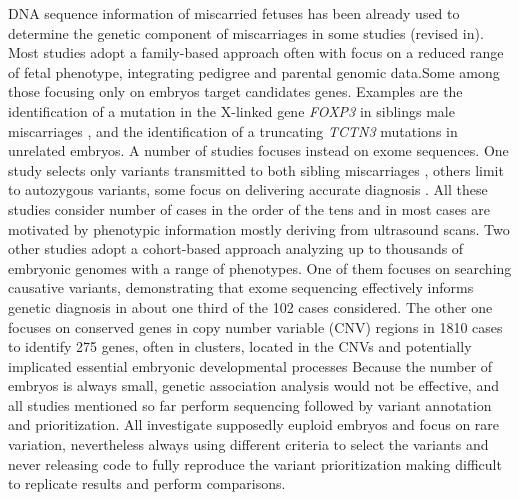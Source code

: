 DNA sequence information of miscarried fetuses has been already used to determine the genetic component of miscarriages in some studies (revised in\cite{rajcan2020next, filges2015exome}). Most studies adopt a family-based approach often with focus on a reduced range of fetal phenotype, integrating pedigree and parental genomic data\cite{bondeson2017nonsense, dohrn2015ecel1,wilbe2015musk, cristofoli2017novel}.Some among those focusing only on embryos target candidates genes. Examples are the identification of a mutation in the X-linked gene \textit{FOXP3} in siblings male miscarriages \cite{rae2015novel}, and the identification of a truncating \textit{TCTN3} mutations in unrelated embryos\cite{thomas2012tctn3}. A number of studies focuses instead on exome sequences\cite{shamseldin2015identification, qiao2016whole,fu2018whole, meier2019exome, yates2017whole}. One study selects only variants transmitted to both sibling miscarriages \cite{qiao2016whole}, others limit to autozygous variants\cite{thomas2012tctn3, shamseldin2015identification}, some focus on delivering accurate diagnosis \cite{meier2019exome}. All these studies consider number of cases in the order of the tens and in most cases are motivated by phenotypic information mostly deriving from ultrasound scans. 
Two other studies adopt a cohort-based approach analyzing up to thousands of embryonic genomes with a range of phenotypes\cite{chen2017characterization,zhao2020exome}. One of them focuses on  searching causative variants, demonstrating that exome sequencing effectively informs genetic diagnosis in about one third of the 102 cases considered\cite{zhao2020exome}. The other one focuses on conserved genes in copy number variable (CNV) regions in 1810 cases to identify 275 genes, often in clusters, located in the CNVs and potentially implicated essential embryonic developmental processes\cite{chen2017characterization}
Because the number of embryos is always small, genetic association analysis would not be effective, and all studies mentioned so far perform sequencing followed by variant annotation and prioritization. All investigate supposedly euploid embryos and focus on rare variation, nevertheless always using different criteria to select the variants and never releasing code to fully reproduce the variant prioritization making difficult to replicate results and perform comparisons.  


